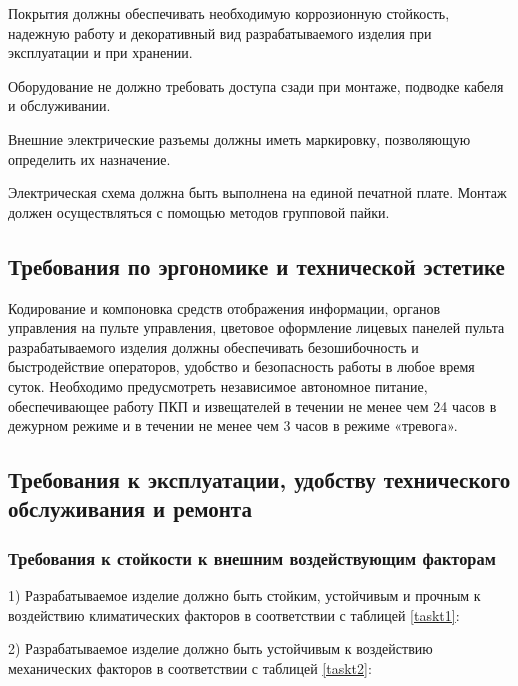 					Покрытия должны обеспечивать необходимую коррозионную стойкость, надежную работу и декоративный вид разрабатываемого изделия при эксплуатации и при хранении.

					Оборудование не должно требовать доступа сзади при монтаже, подводке кабеля и обслуживании.

					Внешние электрические разъемы должны иметь маркировку, позволяющую определить их назначение.

					Электрическая схема должна быть выполнена на единой печатной плате. Монтаж должен осуществляться с помощью методов групповой пайки.

		\subsection{Требования по эргономике и технической эстетике}
			Кодирование и компоновка средств отображения информации, органов управления на пульте управления, цветовое оформление лицевых панелей пульта разрабатываемого изделия должны обеспечивать безошибочность и быстродействие операторов, удобство и безопасность работы в любое время суток.  Необходимо предусмотреть независимое автономное питание, обеспечивающее работу ПКП и извещателей в течении не менее чем 24 часов в дежурном режиме и в течении не менее чем 3 часов в режиме «тревога».
		\subsection{Требования к эксплуатации, удобству технического обслуживания и ремонта}
			\subsubsection{Требования к стойкости к внешним воздействующим факторам}
				1) Разрабатываемое изделие должно быть стойким, устойчивым и прочным к воздействию климатических факторов в соответствии с таблицей \ref{taskt1}:
				

				2) Разрабатываемое изделие должно быть устойчивым к воздействию механических факторов в соответствии с таблицей \ref{taskt2}:
				

